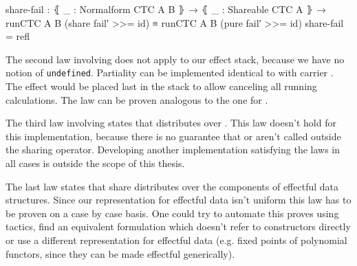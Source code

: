 \begin{code}
share-fail : ⦃ _ : Normalform CTC A B ⦄ → ⦃ _ : Shareable CTC A ⦄ →
  runCTC {A} {B} (share fail′ >>= id) ≡ runCTC {A} {B} (pure fail′ >>= id)
share-fail = refl
\end{code}
The second law involving  does not apply to our effect
stack, because we have no notion of \texttt{undefined}.
Partiality can be implemented identical to  with carrier
.
The effect would be placed last in the stack to allow canceling all running
calculations.
The law can be proven analogous to the one for .

The third law involving  states that 
distributes over .
This law doesn't hold for this implementation, because there is no guarantee
that  or  aren't called outside the sharing
operator.
Developing another implementation satisfying the laws in all cases is outside
the scope of this thesis.

The last law states that share distributes over the components of effectful
data structures.
Since our representation for effectful data isn't uniform this law has to be
proven on a case by case basis.
One could try to automate this proves using tactics, find an equivalent
formulation which doesn't refer to constructors directly or use a different
representation for effectful data (e.g. fixed points of polynomial functors,
since they can be made effectful generically).